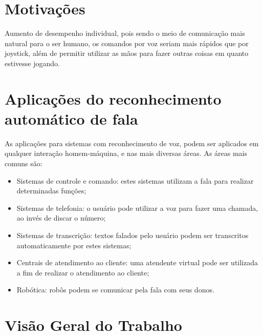 \section{Motivações}
Aumento de desempenho individual, pois sendo o meio de comunicação mais natural para o ser humano, os comandos por voz seriam mais rápidos que por joystick, além de permitir utilizar as mãos para fazer outras coisas em quanto estivesse jogando.

\section{Aplicações do reconhecimento automático de fala}
As aplicações para sistemas com reconhecimento de voz, podem ser aplicados em qualquer interação homem-máquina, 
e nas mais diversas áreas. As áreas mais comuns são:

\begin{itemize}
\item Sistemas de controle e comando: estes sistemas utilizam a fala para realizar
determinadas funções;
\item Sistemas de telefonia: o usuário pode utilizar a voz para fazer uma chamada, ao
invés de discar o número;
\item Sistemas de transcrição: textos falados pelo usuário podem ser transcritos
automaticamente por estes sistemas;
\item Centrais de atendimento ao cliente: uma atendente virtual pode ser utilizada a fim
de realizar o atendimento ao cliente;
\item Robótica: robôs podem se comunicar pela fala com seus donos.

\end{itemize}

\section{Visão Geral do Trabalho}
